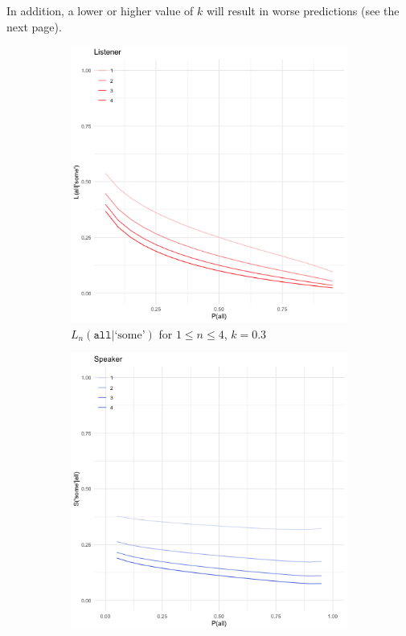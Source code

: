 \documentclass[12pt, a4paper, usenames, dvipsnames]{article}
\begin{document}
In addition, a lower or higher value of $k$ will result in worse predictions (see the next page).
\begin{figure}[!htb]
  \begin{subfigure}{.48\linewidth} 
    \includegraphics[width=\textwidth]{graphs/shannonRSA-L03.png}
    \caption{\(L_n(\texttt{all}|\text{`some'})\) for \(1\leq n\leq 4\), $k=0.3$}
  \end{subfigure}
  \begin{subfigure}{.48\linewidth} 
    \includegraphics[width=\textwidth]{graphs/shannonRSA-S03.png}

\end{subfigure}
\end{figure}
\end{document}
